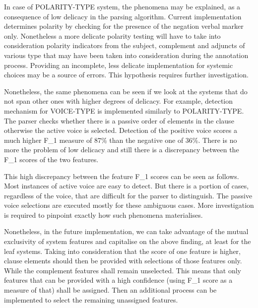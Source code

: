 In case of POLARITY-TYPE system, the phenomena may be explained, as a consequence of low delicacy in the parsing algorithm. Current implementation determines polarity by checking for the presence of the negation verbal marker only. Nonetheless a more delicate polarity testing will have to take into consideration polarity indicators from the subject, complement and adjuncts of various type that may have been taken into consideration during the annotation process. Providing an incomplete, less delicate implementation for systemic choices may be a source of errors. This hypothesis requires further investigation.  %

Nonetheless, the same phenomena can be seen if we look at the systems that do not span other ones with higher degrees of delicacy. For example, detection mechanism for VOICE-TYPE is implemented similarly to POLARITY-TYPE. The parser checks whether there is a passive order of elements in the clause otherwise the active voice is selected.  Detection of the positive voice scores a much higher F_1 measure of 87\% than the negative one of 36\%. There is no more the problem of low delicacy and still there is a discrepancy between the F_1 scores of the two features. %

This high discrepancy between the feature F_1 scores can be seen as follows. Most instances of active voice are easy to detect. But there is a portion of cases, regardless of the voice, that are difficult for the parser to distinguish. The passive voice selections are executed mostly for these ambiguous cases. More investigation is required to pinpoint exactly how such phenomena materialises.

Nonetheless, in the future implementation, we can take advantage of the mutual exclusivity of system features and capitalise on the above finding, at least for the leaf systems. Taking into consideration that the score of one feature is higher, clause elements should then be provided with selections of those features only. While the complement features shall remain unselected. This means that only features that can be provided with a high confidence (using F_1 score as a measure of that) shall be assigned. Then an additional process can be implemented to select the remaining unassigned features. 


